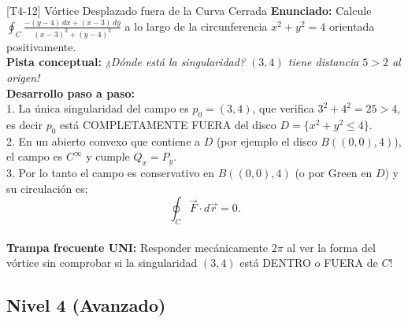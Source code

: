 \documentclass[11pt,a4paper]{article}
\begin{document}
\begin{ejerciciobox}{[T4-12] Vórtice Desplazado fuera de la Curva Cerrada}
\textbf{Enunciado:} Calcule $\oint_C \frac{-(y-4)\,dx + (x-3)\,dy}{(x-3)^2 + (y-4)^2}$ a lo largo de la circunferencia $x^2 + y^2 = 4$ orientada positivamente.\\[0.2cm]
\textbf{Pista conceptual:} \emph{¿Dónde está la singularidad? $(3,4)$ tiene distancia $5 > 2$ al origen!}\\[0.2cm]
\textbf{Desarrollo paso a paso:}\\
1. La única singularidad del campo es $p_0 = (3, 4)$, que verifica $3^2 + 4^2 = 25 > 4$, es decir $p_0$ está COMPLETAMENTE FUERA del disco $D = \{x^2+y^2 \le 4\}$.\\
2. En un abierto convexo que contiene a $D$ (por ejemplo el disco $B((0,0), 4)$), el campo es $C^\infty$ y cumple $Q_x = P_y$.\\
3. Por lo tanto el campo es conservativo en $B((0,0), 4)$ (o por Green en $D$) y su circulación es:\\
$$\oint_C \vec{F}\cdot d\vec{r} = 0.$$\\[0.2cm]
\textbf{Trampa frecuente UNI:} Responder mecánicamente $2\pi$ al ver la forma del vórtice sin comprobar si la singularidad $(3,4)$ está DENTRO o FUERA de $C$!
\end{ejerciciobox}

\subsection{Nivel 4 (Avanzado)}
\end{document}
